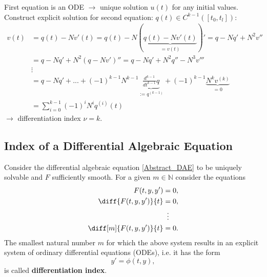 	\begin{frame}
		First equation is an ODE $\to$ unique solution $u(t)$ for any initial values. 
		Construct explicit solution for second equation: $q(t) \in C^{k-1}([t_0,t_l])$:
		\begin{align*}
			v(t) &= q(t) - Nv'(t) = q(t) - N(\underbrace{q(t)-Nv'(t)}_{=v(t)})' = q-Nq'+N^2v'' \\
			&= q-Nq'+N^2(q-Nv')'' = q-Nq'+N^2q''-N^3v''' \\
			&\vdots \\
			&= q-Nq'+...+(-1)^{k-1}N^{k-1}\underbrace{\frac{d^{k-1}}{dt^{k-1}}q}_{:=q^{(k-1)}}+(-1)^{k-1} \underbrace{N^kv^{(k)}}_{=0}\\ 
			&= \sum_{i=0}^{k-1} (-1)^iN^iq^{(i)}(t)
		\end{align*}	
		$\to$ differentiation index $\nu = k$.
	\end{frame}

%		
	
	
	
	\subsection{Index of a Differential Algebraic Equation}
	
	\begin{frame}
		\begin{definition}%
			Consider the differential algebraic equation \eqref{Abstract_DAE} to be uniquely solvable and $F$ sufficiently smooth. For a given $m \in \mathbb{N}$ consider the equations
			\begin{displaymath}
				\begin{aligned}
					F(t,y,y') &= 0, \\
					\diff{F(t,y,y')}{t} &= 0, \\
					&\vdotswithin{=} \\
					\diff[m]{F(t,y,y')}{t} &= 0.
				\end{aligned}
			\end{displaymath}
			The smallest natural number $m$ for which the above system results in an explicit system of ordinary differential equations (ODEs), i.e. it has the form
			\begin{displaymath}
				y' = \phi(t,y),
			\end{displaymath}
			is called \textbf{differentiation index}.
		\end{definition}
		
	\end{frame}

